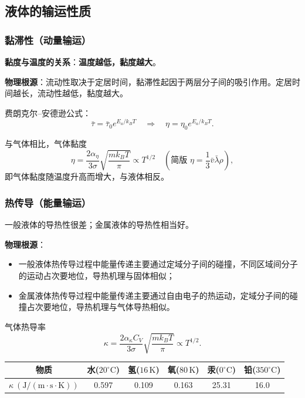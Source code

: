 \documentclass[UTF8]{ctexart}
\theoremstyle{definition}
\begin{document}
\subsection{液体的输运性质}

\subsubsection*{黏滞性（动量输运）}

\textbf{黏度与温度的关系}：\textbf{温度越低，黏度越大}。

\textbf{物理根源}：流动性取决于定居时间，黏滞性起因于两层分子间的吸引作用。定居时间越长，流动性越低，黏度越大。

费朗克尔--安德逊公式：
\begin{equation}
\bar{\tau} = \bar{\tau}_0 e^{E_a/k_BT}
\quad\Rightarrow\quad
\eta = \eta_0 e^{E_a/k_BT}.
\end{equation}

与气体相比，气体黏度
\begin{equation}
\eta = \frac{2\alpha_\eta}{3\sigma}\sqrt{\frac{mk_BT}{\pi}} \propto T^{1/2}
\quad\left(\text{简版 }\eta = \frac{1}{3}\bar{v}\bar{\lambda}\rho\right),
\end{equation}
即气体黏度随温度升高而增大，与液体相反。

\subsubsection*{热传导（能量输运）}

一般液体的导热性很差；金属液体的导热性相当好。

\textbf{物理根源}：
\begin{itemize}
    \item 一般液体热传导过程中能量传递主要通过定域分子间的碰撞，不同区域间分子的运动占次要地位，导热机理与固体相似；
    \item 金属液体热传导过程中能量传递主要通过自由电子的热运动，定域分子间的碰撞占次要地位，导热机理与气体导热相似。
\end{itemize}

气体热导率
\begin{equation}
\kappa = \frac{2\alpha_\kappa C_V}{3\sigma}\sqrt{\frac{mk_BT}{\pi}} \propto T^{1/2}.
\end{equation}

\begin{center}
\begin{tabular}{c|c|c|c|c|c}
\hline
物质 & 水($20^\circ\mathrm{C}$) & 氢($16\,\mathrm{K}$) & 氧($80\,\mathrm{K}$) & 汞($0^\circ\mathrm{C}$) & 铅($350^\circ\mathrm{C}$) \\
\hline
$\kappa\ (\mathrm{J/(m\cdot s\cdot K)})$ & 0.597 & 0.109 & 0.163 & 25.31 & 16.0 \\
\hline
\end{tabular}
\end{center}
\end{document}
